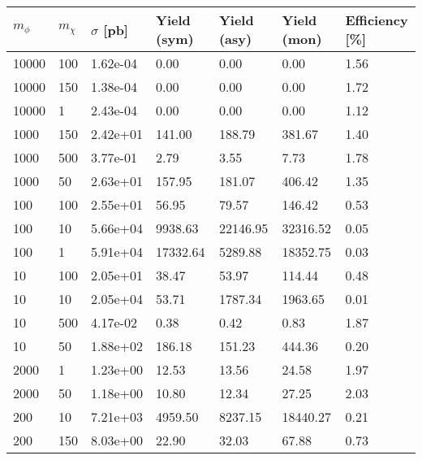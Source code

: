 \begin{table}
\small
\centering
\begin{tabular}{lllllll}
\hline
$m_\phi$ & $m_\chi$ & $\sigma$ [pb] & Yield (sym) & Yield (asy) & Yield (mon) & Efficiency [\%] \\ \hline
10000     &   100       &   1.62e-04  &   0.00      &   0.00      &   0.00      &   1.56      \\ 
10000     &   150       &   1.38e-04  &   0.00      &   0.00      &   0.00      &   1.72      \\ 
10000     &   1         &   2.43e-04  &   0.00      &   0.00      &   0.00      &   1.12      \\ 
1000      &   150       &   2.42e+01  &   141.00    &   188.79    &   381.67    &   1.40      \\ 
1000      &   500       &   3.77e-01  &   2.79      &   3.55      &   7.73      &   1.78      \\ 
1000      &   50        &   2.63e+01  &   157.95    &   181.07    &   406.42    &   1.35      \\ 
100       &   100       &   2.55e+01  &   56.95     &   79.57     &   146.42    &   0.53      \\ 
100       &   10        &   5.66e+04  &   9938.63   &   22146.95  &   32316.52  &   0.05      \\ 
100       &   1         &   5.91e+04  &   17332.64  &   5289.88   &   18352.75  &   0.03      \\ 
10        &   100       &   2.05e+01  &   38.47     &   53.97     &   114.44    &   0.48      \\ 
10        &   10        &   2.05e+04  &   53.71     &   1787.34   &   1963.65   &   0.01      \\ 
10        &   500       &   4.17e-02  &   0.38      &   0.42      &   0.83      &   1.87      \\ 
10        &   50        &   1.88e+02  &   186.18    &   151.23    &   444.36    &   0.20      \\ 
2000      &   1         &   1.23e+00  &   12.53     &   13.56     &   24.58     &   1.97      \\ 
2000      &   50        &   1.18e+00  &   10.80     &   12.34     &   27.25     &   2.03      \\ 
200       &   10        &   7.21e+03  &   4959.50   &   8237.15   &   18440.27  &   0.21      \\ 
200       &   150       &   8.03e+00  &   22.90     &   32.03     &   67.88     &   0.73      \\ 

\end{tabular}
\end{table}
